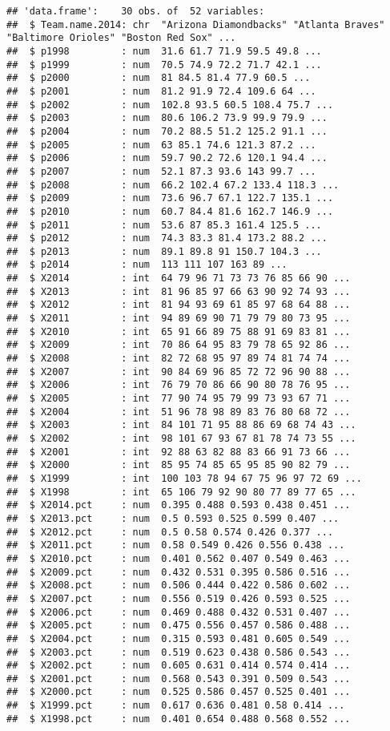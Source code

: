 \documentclass[
]{article}
\begin{document}
\begin{verbatim}
## 'data.frame':    30 obs. of  52 variables:
##  $ Team.name.2014: chr  "Arizona Diamondbacks" "Atlanta Braves" "Baltimore Orioles" "Boston Red Sox" ...
##  $ p1998         : num  31.6 61.7 71.9 59.5 49.8 ...
##  $ p1999         : num  70.5 74.9 72.2 71.7 42.1 ...
##  $ p2000         : num  81 84.5 81.4 77.9 60.5 ...
##  $ p2001         : num  81.2 91.9 72.4 109.6 64 ...
##  $ p2002         : num  102.8 93.5 60.5 108.4 75.7 ...
##  $ p2003         : num  80.6 106.2 73.9 99.9 79.9 ...
##  $ p2004         : num  70.2 88.5 51.2 125.2 91.1 ...
##  $ p2005         : num  63 85.1 74.6 121.3 87.2 ...
##  $ p2006         : num  59.7 90.2 72.6 120.1 94.4 ...
##  $ p2007         : num  52.1 87.3 93.6 143 99.7 ...
##  $ p2008         : num  66.2 102.4 67.2 133.4 118.3 ...
##  $ p2009         : num  73.6 96.7 67.1 122.7 135.1 ...
##  $ p2010         : num  60.7 84.4 81.6 162.7 146.9 ...
##  $ p2011         : num  53.6 87 85.3 161.4 125.5 ...
##  $ p2012         : num  74.3 83.3 81.4 173.2 88.2 ...
##  $ p2013         : num  89.1 89.8 91 150.7 104.3 ...
##  $ p2014         : num  113 111 107 163 89 ...
##  $ X2014         : int  64 79 96 71 73 73 76 85 66 90 ...
##  $ X2013         : int  81 96 85 97 66 63 90 92 74 93 ...
##  $ X2012         : int  81 94 93 69 61 85 97 68 64 88 ...
##  $ X2011         : int  94 89 69 90 71 79 79 80 73 95 ...
##  $ X2010         : int  65 91 66 89 75 88 91 69 83 81 ...
##  $ X2009         : int  70 86 64 95 83 79 78 65 92 86 ...
##  $ X2008         : int  82 72 68 95 97 89 74 81 74 74 ...
##  $ X2007         : int  90 84 69 96 85 72 72 96 90 88 ...
##  $ X2006         : int  76 79 70 86 66 90 80 78 76 95 ...
##  $ X2005         : int  77 90 74 95 79 99 73 93 67 71 ...
##  $ X2004         : int  51 96 78 98 89 83 76 80 68 72 ...
##  $ X2003         : int  84 101 71 95 88 86 69 68 74 43 ...
##  $ X2002         : int  98 101 67 93 67 81 78 74 73 55 ...
##  $ X2001         : int  92 88 63 82 88 83 66 91 73 66 ...
##  $ X2000         : int  85 95 74 85 65 95 85 90 82 79 ...
##  $ X1999         : int  100 103 78 94 67 75 96 97 72 69 ...
##  $ X1998         : int  65 106 79 92 90 80 77 89 77 65 ...
##  $ X2014.pct     : num  0.395 0.488 0.593 0.438 0.451 ...
##  $ X2013.pct     : num  0.5 0.593 0.525 0.599 0.407 ...
##  $ X2012.pct     : num  0.5 0.58 0.574 0.426 0.377 ...
##  $ X2011.pct     : num  0.58 0.549 0.426 0.556 0.438 ...
##  $ X2010.pct     : num  0.401 0.562 0.407 0.549 0.463 ...
##  $ X2009.pct     : num  0.432 0.531 0.395 0.586 0.516 ...
##  $ X2008.pct     : num  0.506 0.444 0.422 0.586 0.602 ...
##  $ X2007.pct     : num  0.556 0.519 0.426 0.593 0.525 ...
##  $ X2006.pct     : num  0.469 0.488 0.432 0.531 0.407 ...
##  $ X2005.pct     : num  0.475 0.556 0.457 0.586 0.488 ...
##  $ X2004.pct     : num  0.315 0.593 0.481 0.605 0.549 ...
##  $ X2003.pct     : num  0.519 0.623 0.438 0.586 0.543 ...
##  $ X2002.pct     : num  0.605 0.631 0.414 0.574 0.414 ...
##  $ X2001.pct     : num  0.568 0.543 0.391 0.509 0.543 ...
##  $ X2000.pct     : num  0.525 0.586 0.457 0.525 0.401 ...
##  $ X1999.pct     : num  0.617 0.636 0.481 0.58 0.414 ...
##  $ X1998.pct     : num  0.401 0.654 0.488 0.568 0.552 ...
\end{verbatim}
\end{document}
